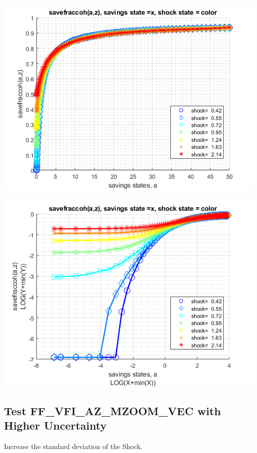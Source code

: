 \documentclass[
]{book}
\begin{document}
\includegraphics[width=5.20833in,height=\textheight]{img/fx_vfi_az_mzoom_vec_images/figure_6.png}

\includegraphics[width=5.20833in,height=\textheight]{img/fx_vfi_az_mzoom_vec_images/figure_7.png}

\hypertarget{test-ff_vfi_az_mzoom_vec-with-higher-uncertainty}{%
\subsection{Test FF\_VFI\_AZ\_MZOOM\_VEC with Higher Uncertainty}\label{test-ff_vfi_az_mzoom_vec-with-higher-uncertainty}}

Increase the standard deviation of the Shock.
\end{document}
